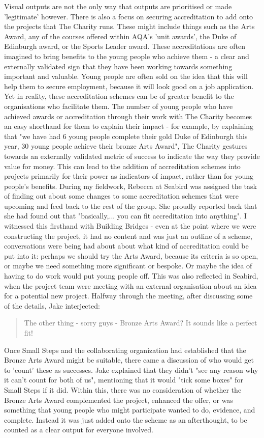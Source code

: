Visual outputs are not the only way that outputs are prioritised or made 'legitimate' however. There is also a focus on securing accreditation to add onto the projects that The Charity runs. These might include things such as the Arts Award, any of the courses offered within AQA's 'unit awards', the Duke of Edinburgh award, or the Sports Leader award. These accreditations are often imagined to bring benefits to the young people who achieve them - a clear and externally validated sign that they have been working towards something important and valuable. Young people are often sold on the idea that this will help them to secure employment, because it will look good on a job application. Yet in reality, these accreditation schemes can be of greater benefit to the organisations who facilitate them. The number of young people who have achieved awards or accreditation through their work with The Charity becomes an easy shorthand for them to explain their impact - for example, by explaining that "we have had 6 young people complete their gold Duke of Edinburgh this year, 30 young people achieve their bronze Arts Award", The Charity gestures towards an externally validated metric of success to indicate the way they provide value for money. This can lead to the addition of accreditation schemes into projects primarily for their power as indicators of impact, rather than for young people's benefits. During my fieldwork, Rebecca at Seabird was assigned the task of finding out about some changes to some accreditation schemes that were upcoming and feed back to the rest of the group. She proudly reported back that she had found out that "basically,... you can fit accreditation into anything". I witnessed this firsthand with Building Bridges - even at the point where we were constructing the project, it had no content and was just an outline of a scheme,  conversations were being had about about what kind of accreditation could be put into it: perhaps we should try the Arts Award, because its criteria is so open, or maybe we need something more significant or bespoke. Or maybe the idea of having to do work would put young people off.  This was also reflected in Seabird, when the project team were meeting with an external organisation about an idea for a potential new project. Halfway through the meeting, after discussing some of the details, Jake interjected:
\begin{quote}
The other thing - sorry guys - Bronze Arts Award? It sounds like a perfect fit!    
\end{quote}
Once Small Steps and the collaborating organization had established that the Bronze Arts Award might be suitable, there came a discussion of who would get to 'count' these as successes. Jake explained that they didn't "see any reason why it can't count for both of us",  mentioning that it would "tick some boxes" for Small Steps if it did. Within this, there was no consideration of whether the Bronze Arts Award complemented the project, enhanced the offer, or was something that young people who might participate wanted to do, evidence, and complete. Instead it was just added onto the scheme as an afterthought, to be counted as a clear output for everyone involved.

